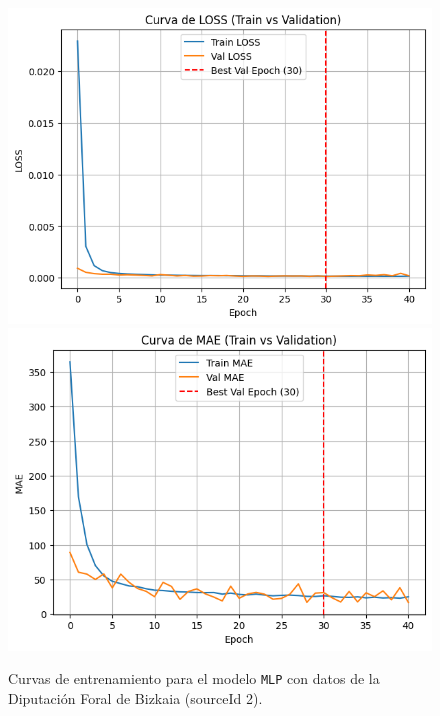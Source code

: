 \begin{figure}[H]
	\centering
	\caption{Curvas de entrenamiento para el modelo \texttt{MLP} con datos de la Diputación Foral de Bizkaia (sourceId 2).}
	\begin{minipage}{0.48\textwidth}
		\centering
		\includegraphics[width=\linewidth]{includes/cap5/graphs/sid2_mlp_loss.png}
		\vspace{0.2cm}
		\includegraphics[width=\linewidth]{includes/cap5/graphs/sid2_mlp_mae.png}
		\vspace{0.2cm}

\end{minipage}
\end{figure}
